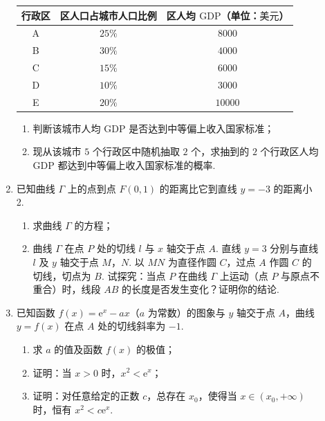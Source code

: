\begin{description}
\begin{enumerate}[leftmargin=5pt]
\begin{center}
\begin{tabular}{|c|c|c|}
\hline
行政区 & 区人口占城市人口比例 & 区人均 \(\mathrm{GDP}\)（单位：\(\text{美元}\)） \\
\hline
A & \(25\%\) & \(8000\) \\
\hline
B & \(30\%\) & \(4000\) \\
\hline
C & \(15\%\) & \(6000\) \\
\hline
D & \(10\%\) & \(3000\) \\
\hline
E & \(20\%\) & \(10000\) \\
\hline
\end{tabular}
\end{center}

\begin{enumerate}[itemsep=0pt,topsep=0pt]
\item 判断该城市人均 \(\mathrm{GDP}\) 是否达到中等偏上收入国家标准；
\item 现从该城市 \(5\) 个行政区中随机抽取 \(2\) 个，求抽到的 \(2\) 个行政区人均 \(\mathrm{GDP}\) 都达到中等偏上收入国家标准的概率.
\end{enumerate}

        \item 已知曲线 \(\Gamma\) 上的点到点 \(F(0,1)\) 的距离比它到直线 \(y = -3\) 的距离小 2.

\begin{enumerate}[itemsep=0pt,topsep=0pt]
\item 求曲线 \(\Gamma\) 的方程；
\item 曲线 \(\Gamma\) 在点 \(P\) 处的切线 \(l\) 与 \(x\) 轴交于点 \(A\). 直线 \(y = 3\) 分别与直线 \(l\) 及 \(y\) 轴交于点 \(M\)，\(N\). 以 \(MN\) 为直径作圆 \(C\)，过点 \(A\) 作圆 \(C\) 的切线，切点为 \(B\). 试探究：当点 \(P\) 在曲线 \(\Gamma\) 上运动（点 \(P\) 与原点不重合）时，线段 \(AB\) 的长度是否发生变化？证明你的结论.
\end{enumerate}

        \item 已知函数 \( f(x) = {\mathrm{e}}^{x} - ax \)（\(a\) 为常数）的图象与 \(y\) 轴交于点 \(A\)，曲线 \( y = f(x) \) 在点 \(A\) 处的切线斜率为 \(-1\).

\begin{enumerate}[itemsep=0pt,topsep=0pt]
\item 求 \(a\) 的值及函数 \(f(x)\) 的极值；
\item 证明：当 \(x > 0\) 时，\(x^2 < {\mathrm{e}}^x\)；
\item 证明：对任意给定的正数 \(c\)，总存在 \(x_0\)，使得当 \(x \in (x_0, +\infty)\) 时，恒有 \(x^2 < c{\mathrm{e}}^x\).
\end{enumerate}

    \end{enumerate}

\end{description}


